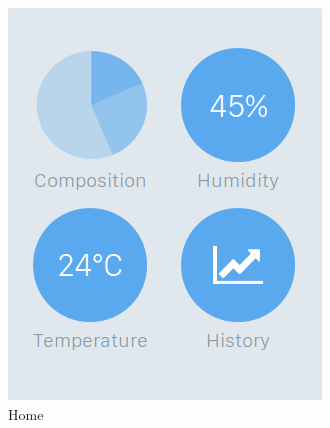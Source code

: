 \documentclass[a4paper,10pt]{article}
\begin{document}
\begin{figure}[!h]
    \begin{subfigure}[!h]{0.3\textwidth}
        \includegraphics[width=\textwidth]{images/home.png}
        \caption{Home}
    \end{subfigure}
    \begin{subfigure}[!h]{0.3\textwidth}

\end{subfigure}
\end{figure}
\end{document}
